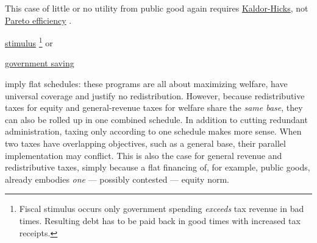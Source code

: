 \begin{description}
\begin{inparaenum}
{			This case of little or no utility from public good again requires \hyperref[sec:KaldorHicks]{Kaldor-Hicks}, not \hyperref[sec:Pareto]{Pareto efficiency} \citep{Kaldor1939,Hicks1939}.
		}


		\item \hyperref[sec:fiscal-stimulus]{stimulus}
		\footnote{
			Fiscal stimulus occurs only government spending \emph{exceeds} tax revenue in bad times.
			Resulting debt has to be paid back in good times with increased tax receipts.
		}
		or

		\item \hyperref[sec:government-saves]{government saving}
	\end{inparaenum}
	imply flat schedules:
	these programs are all about maximizing welfare, have universal coverage and justify no redistribution.
	However,
		\label{sec:redistribution-and-revenue-are-one}
	because redistributive taxes for equity and general-revenue taxes for welfare share the \emph{same base}, they can also be rolled up in one combined schedule.
	In addition to cutting redundant administration, taxing only according to one schedule makes more sense.
	When two taxes have overlapping objectives, such as a general base, their parallel implementation may conflict.
	This is also the case for general revenue and redistributive taxes, simply because a flat financing of, for example, public goods, already embodies \emph{one} --- possibly contested --- equity norm.
\end{description}


